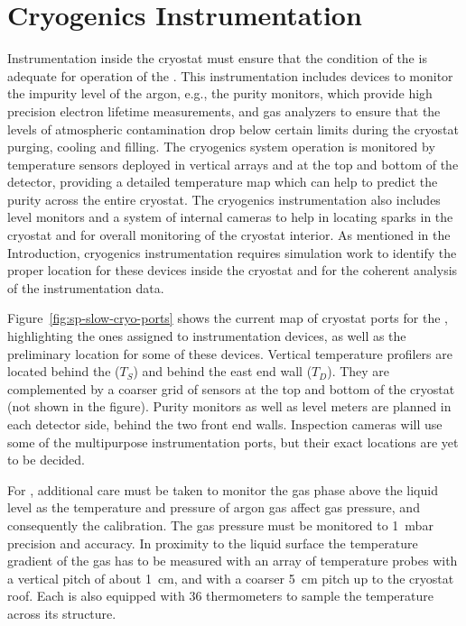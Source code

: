 \section{Cryogenics Instrumentation}
\label{sec:fdsp-cryo-instr} %
\label{sec:fddp-cryo-instr} %
\label{sec:fdgen-cryo-instr} %

Instrumentation inside the cryostat must ensure that the condition of the  is adequate for operation of the .
This instrumentation includes devices to monitor the impurity level of the argon, e.g., the purity monitors, which provide high precision electron lifetime measurements,
and gas analyzers to ensure that the levels of atmospheric contamination drop below certain limits during the cryostat purging, cooling and filling.
The cryogenics system operation is monitored by temperature sensors deployed in vertical arrays and at the top and bottom of the detector, providing a 
detailed \threed temperature map which can help to predict the  purity across the entire cryostat. The cryogenics instrumentation also includes \lar level monitors and
a system of internal cameras to help in locating sparks in the cryostat and for overall monitoring of the cryostat interior. 
As mentioned in the Introduction, cryogenics instrumentation requires simulation work to identify the proper location for these devices inside the cryostat and
for the coherent analysis of the instrumentation data. 

Figure~\ref{fig:sp-slow-cryo-ports} shows the current map of cryostat ports for the , highlighting the ones assigned to instrumentation devices,
as well as the preliminary location for some of these devices. Vertical temperature profilers are located behind the  ($T_S$) and behind the east end wall ($T_D$).
They are complemented by a coarser \twod grid of sensors at the top and bottom of the cryostat (not shown in the figure). Purity monitors as well as level meters are planned
in each detector side, behind the two front end walls. Inspection cameras will use some of the multipurpose instrumentation ports, but their exact locations are yet to be decided. 

For \dual, additional care must be taken to monitor the gas phase above the liquid level as the temperature and pressure of argon gas affect gas pressure, and consequently the  calibration.  The gas pressure must be monitored to \SI{1}{mbar} precision and accuracy. In proximity to the liquid surface the temperature gradient of the  gas has to be measured with an array of temperature probes with a vertical pitch of about \SI{1}{cm}, and with a coarser \SI{5}{cm} pitch up to the cryostat roof. Each  is also equipped with \num{36} thermometers to sample the temperature across its structure.


